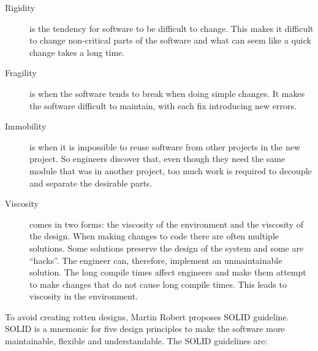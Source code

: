 \begin{description}

\item[ Rigidity ] is the tendency for software to be difficult to
change. This makes it difficult to change non-critical parts of the software and
what can seem like a quick change takes a long time.

\item[ Fragility ] is when the software tends to break when doing
simple changes. It makes the software difficult to maintain, with each fix
introducing new errors.

\item[ Immobility ] is when it is impossible to reuse software from
other projects in the new project. So engineers discover that, even though they
need the same module that was in another project, too much work is required to
decouple and separate the desirable parts.

\item[ Viscosity ] comes in two forms: the viscosity of the environment and the
    viscosity of the design. When making changes to code there are often
    multiple solutions. Some solutions preserve the design of the system and
    some are ``hacks''. The engineer can, therefore, implement an unmaintainable
    solution. The long compile times affect engineers and make them attempt to
    make changes that do not cause long compile times.  This leads to viscosity
    in the environment.

\end{description}

To avoid creating rotten designs, Martin Robert proposes SOLID guideline.  SOLID
is a mnemonic for five design principles to make the software more maintainable,
flexible and understandable. The SOLID guidelines are:

